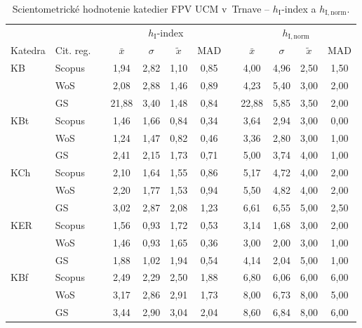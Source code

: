 \begin{table}
  \centering\small
  \caption[Hodnotenie FPV -- $h_{\mathrm{I}}$-index a $h_{\mathrm{I,norm}}$]%
  {Scientometrické hodnotenie katedier FPV UCM v~Trnave -- $h_{\mathrm{I}}$-index a $h_{\mathrm{I,norm}}$.}
  \label{tab:4-staff.results}
  \begin{tabularx}{\textwidth}{XXp{1ex}ccccp{1ex}cccc}
    \toprule
    & & & \multicolumn{4}{c}{$h_{\mathrm{I}}$-index} & & \multicolumn{4}{c}{$h_{\mathrm{I,norm}}$} \\
    \cmidrule{4-7}\cmidrule{9-12}
    Katedra & Cit. reg. & & $\bar{x}$ & $\sigma$ & $\tilde{x}$ & MAD & & $\bar{x}$ & $\sigma$ & $\tilde{x}$ & MAD \\
    \midrule
    KB   & Scopus & & 1,94  & 2,82 & 1,10 & 0,85 & & 4,00  & 4,96 & 2,50 & 1,50 \\
         & WoS    & & 2,08  & 2,88 & 1,46 & 0,89 & & 4,23  & 5,40 & 3,00 & 2,00 \\
         & GS     & & 21,88 & 3,40 & 1,48 & 0,84 & & 22,88 & 5,85 & 3,50 & 2,00 \\[1ex]
    KBt  & Scopus & & 1,46  & 1,66 & 0,84 & 0,34 & & 3,64  & 2,94 & 3,00 & 0,00 \\
         & WoS    & & 1,24  & 1,47 & 0,82 & 0,46 & & 3,36  & 2,80 & 3,00 & 1,00 \\
         & GS     & & 2,41  & 2,15 & 1,73 & 0,71 & & 5,00  & 3,74 & 4,00 & 1,00 \\[1ex]
    KCh  & Scopus & & 2,10  & 1,64 & 1,55 & 0,86 & & 5,17  & 4,72 & 4,00 & 2,00 \\
         & WoS    & & 2,20  & 1,77 & 1,53 & 0,94 & & 5,50  & 4,82 & 4,00 & 2,00 \\
         & GS     & & 3,02  & 2,87 & 2,08 & 1,23 & & 6,61  & 6,55 & 5,00 & 2,50 \\[1ex]
    KER  & Scopus & & 1,56  & 0,93 & 1,72 & 0,53 & & 3,14  & 1,68 & 3,00 & 2,00 \\
         & WoS    & & 1,46  & 0,93 & 1,65 & 0,36 & & 3,00  & 2,00 & 3,00 & 1,00 \\
         & GS     & & 1,88  & 1,02 & 1,94 & 0,54 & & 4,14  & 2,04 & 5,00 & 1,00 \\[1ex]
    KBf  & Scopus & & 2,49  & 2,29 & 2,50 & 1,88 & & 6,80  & 6,06 & 6,00 & 6,00 \\
         & WoS    & & 3,17  & 2,86 & 2,91 & 1,73 & & 8,00  & 6,73 & 8,00 & 5,00 \\
         & GS     & & 3,44  & 2,90 & 3,04 & 2,04 & & 8,60  & 6,84 & 8,00 & 6,00 \\[1ex]

\end{tabularx}
\end{table}
